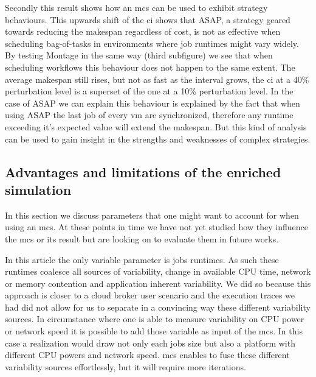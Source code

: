 \documentclass[10pt,conference,compsocconf]{IEEEtran}
\begin{document}
Secondly this result shows how an \ac{mcs} can be used to exhibit strategy
behaviours. This upwards shift of the \ac{ci} shows that ASAP, a strategy
geared towards reducing the makespan regardless of cost, is not as effective
when scheduling bag-of-tasks in environments where job runtimes might vary
widely. By testing Montage in the same way (third subfigure) we see that when
scheduling workflows this behaviour does not happen to the same extent. The
average makespan still rises, but not as fast as the interval grows, the \ac{ci}
at a 40\% perturbation level is a superset of the one at a 10\% perturbation
level. In the case of ASAP we can explain this behaviour is explained by the
fact that when using ASAP the last job of every \ac{vm} are synchronized,
therefore any runtime exceeding it's expected value will extend the makespan.
But this kind of analysis can be used to gain insight in the strengths and
weaknesses of complex strategies.


\subsection{Advantages and limitations of the enriched simulation}\label{sec:lim}

In this section we discuss parameters that one might want to account for when
using an \ac{mcs}. At these points in time we have not yet studied how they
influence the \ac{mcs} or its result but are looking on to evaluate them in
future works.

In this article the only variable parameter is jobs runtimes. As such these
runtimes coalesce all sources of variability, change in available CPU time,
network or memory contention and application inherent variability. We did so
because this approach is closer to a cloud broker user scenario and  the
execution traces we had did not allow for us to separate in a convincing way these
different variability sources. In circumstance where one is able to measure variability
on CPU power or network speed it is possible to add those variable as input of
the \ac{mcs}. In this case a realization would draw not only each jobs size 
 but also a platform with different CPU powers and network speed.
\ac{mcs} enables to fuse these different variability sources effortlessly, but it will
require more iterations. 
\end{document}
